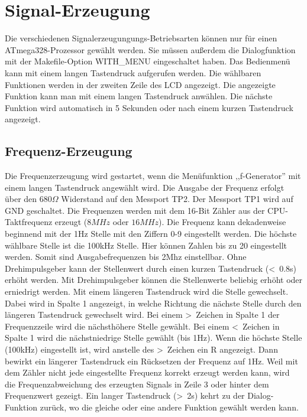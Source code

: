 \chapter{Signal-Erzeugung}

Die verschiedenen Signalerzeugungungs-Betriebsarten können nur für einen ATmega328-Prozessor
gewählt werden.
Sie müssen außerdem die Dialogfunktion mit der Makefile-Option WITH\_MENU eingeschaltet haben.
Das Bedienmenü kann mit einem langen Tastendruck aufgerufen werden.
Die wählbaren Funktionen werden in der zweiten Zeile des LCD angezeigt.
Die angezeigte Funktion kann man mit einem langen Tastendruck anwählen.
Die nächste Funktion wird automatisch in 5 Sekunden oder nach einem kurzen Tastendruck
angezeigt.

\label{sec:generation}

\section{Frequenz-Erzeugung}
Die Frequenzerzeugung wird gestartet, wenn die Menüfunktion ,,f-Generator'' mit einem
langen Tastendruck angewählt wird.
Die Ausgabe der Frequenz erfolgt über den \(680\Omega\) Widerstand auf den Messport TP2.
Der Messport TP1 wird auf GND geschaltet.
Die Frequenzen werden mit dem 16-Bit Zähler aus der CPU-Taktfrequenz erzeugt (\(8MHz\) oder \(16MHz\)).
Die Frequenz kann dekadenweise beginnend mit der 1Hz Stelle mit den Ziffern 0-9 eingestellt werden.
Die höchste wählbare Stelle ist die 100kHz Stelle. Hier können Zahlen bis zu 20 eingestellt werden.
Somit sind Ausgabefrequenzen bis 2Mhz einstellbar.
Ohne Drehimpulsgeber kann der Stellenwert durch einen kurzen Tastendruck (\textless~0.8s)
erhöht werden.
Mit Drehimpulsgeber können die Stellenwerte beliebig erhöht oder erniedrigt werden.
Mit einem längeren Tastendruck wird die Stelle gewechselt.
Dabei wird in Spalte 1 angezeigt, in welche Richtung die nächste Stelle durch den längeren
Tastendruck gewechselt wird.
Bei einem \textgreater~Zeichen in Spalte 1 der Frequenzzeile wird die nächsthöhere
Stelle gewählt.
Bei einem \textless~Zeichen in Spalte 1  wird die nächstniedrige Stelle gewählt (bis 1Hz).
Wenn die höchste Stelle (100kHz) eingestellt ist, wird anstelle des \textgreater~Zeichen
ein R angezeigt. Dann bewirkt ein längerer Tastendruck ein Rücksetzen der Frequenz auf 1Hz.
Weil mit dem Zähler nicht jede eingestellte Frequenz korrekt erzeugt werden kann,
wird die Frequenzabweichung des erzeugten Signals in Zeile 3 oder hinter dem Frequenzwert gezeigt.
Ein langer Tastendruck (\textgreater~2s) kehrt zu der Dialog-Funktion zurück,
wo die gleiche oder eine andere Funktion gewählt werden kann.

